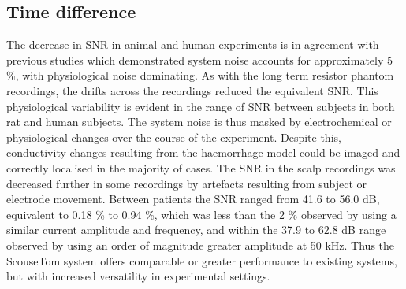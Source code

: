 \subsection{Time difference}
The decrease in SNR in animal and human experiments is in agreement with previous studies \cite{fabrizi2007analysis} which demonstrated system noise accounts for approximately 5 \%, with physiological noise dominating. As with the long term resistor phantom recordings, the drifts across the recordings reduced the equivalent SNR. This physiological variability is evident in the range of SNR between subjects in both rat and human subjects. The system noise is thus masked by electrochemical or physiological changes over the course of the experiment. Despite this, conductivity changes resulting from the haemorrhage model could be imaged and correctly localised in the majority of cases. The SNR in the scalp recordings was decreased further in some recordings by artefacts resulting from subject or electrode movement. Between patients the SNR ranged from 41.6 to 56.0 dB, equivalent to 0.18 \% to 0.94 \%, which was less than the 2 \% observed by \citet{Romsauerova2006} using a similar current amplitude and frequency, and within the 37.9 to 62.8 dB range observed by \citet{Xu2011} using an order of magnitude greater amplitude at 50 kHz. Thus the ScouseTom system offers comparable or greater performance to existing systems, but with increased versatility in experimental settings. 